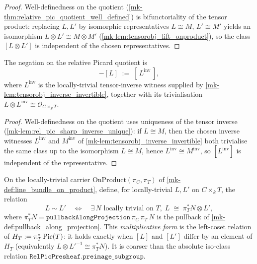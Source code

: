 \begin{proof}
  \leanok
 Well-definedness on the quotient
  (\ref{mk-thm:relative_pic_quotient_well_defined}) is bifunctoriality of the
  tensor product: replacing \(L, L'\) by isomorphic representatives
  \(L \cong M\), \(L' \cong M'\) yields an isomorphism
  \(L \otimes L' \cong M \otimes M'\) (\ref{mk-lem:tensorobj_lift_onproduct}),
  so the class \([L \otimes L']\) is independent of the chosen representatives.
\end{proof}

\begin{definition}\label{mk-def:rel_neg}
  \leanok

  The negation on the relative Picard quotient is
  \[
    -[L] \;:=\; [\,L^{\mathrm{inv}}\,],
  \]
  where \(L^{\mathrm{inv}}\) is the locally-trivial tensor-inverse witness
  supplied by \ref{mk-lem:tensorobj_inverse_invertible}, together with its
  trivialisation \(L \otimes L^{\mathrm{inv}} \cong \mathcal{O}_{C \times_S T}\).
\end{definition}

\begin{proof}
  \leanok
 Well-definedness on the quotient uses uniqueness of
  the tensor inverse (\ref{mk-lem:rel_pic_sharp_inverse_unique}): if
  \(L \cong M\), then the chosen inverse witnesses \(L^{\mathrm{inv}}\) and
  \(M^{\mathrm{inv}}\) of \ref{mk-lem:tensorobj_inverse_invertible} both trivialise
  the same class up to the isomorphism \(L \cong M\), hence
  \(L^{\mathrm{inv}} \cong M^{\mathrm{inv}}\), so \([L^{\mathrm{inv}}]\) is
  independent of the representative.
\end{proof}


\begin{definition}\label{mk-lem:relpic_rel}
  \leanok

  On the locally-trivial carrier \(\mathrm{OnProduct}(\pi_C, \pi_T)\) of
  \ref{mk-def:line_bundle_on_product}, define, for locally-trivial \(L, L'\) on
  \(C \times_k T\), the relation
  \[
    L \sim L' \quad\Longleftrightarrow\quad
      \exists\, N \text{ locally trivial on } T,\;
      L \;\cong\; \pi_T^* N \otimes L' ,
  \]
  where \(\pi_T^* N = \mathtt{pullbackAlongProjection}\,\pi_C\,\pi_T\,N\) is the
  pullback of \ref{mk-def:pullback_along_projection}. This \emph{multiplicative
  form} is the left-coset relation of \(H_T := \pi_T^*\operatorname{Pic}(T)\): it holds exactly
  when \([L]\) and \([L']\) differ by an element of \(H_T\) (equivalently
  \(L \otimes L'^{-1} \cong \pi_T^* N\)). It is coarser than the absolute
  iso-class relation \(\mathtt{RelPicPresheaf.preimage\_subgroup}\).
\end{definition}


